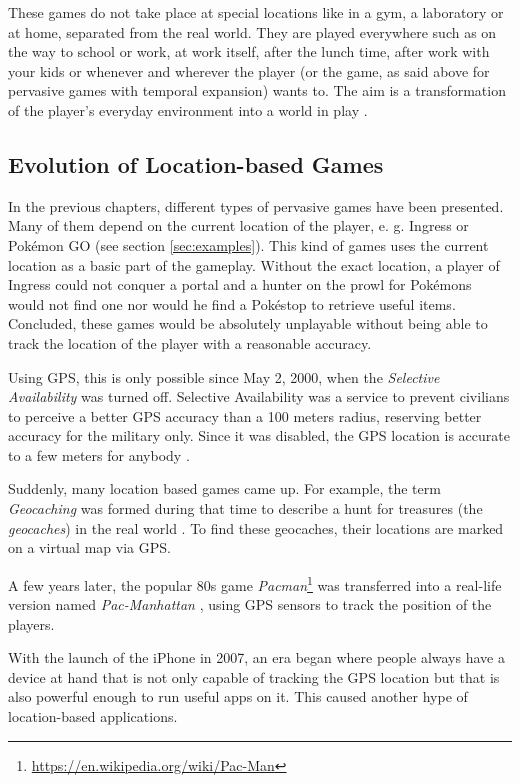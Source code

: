These games do not take place at special locations like in a gym, a laboratory or at home, separated from the real world. They are played everywhere such as on the way to school or work, at work itself, after the lunch time, after work with your kids or whenever and wherever the player (or the game, as said above for pervasive games with temporal expansion) wants to. The aim is a transformation of the player's everyday environment into a world in play \citep{nieuwdorp2009pervasive}.


\subsection{Evolution of Location-based Games}\label{sec:locationBasedGames}
In the previous chapters, different types of pervasive games have been presented. Many of them depend on the current location of the player, e. g. Ingress or Pok\'{e}mon GO (see section \ref{sec:examples}). This kind of games uses the current location as a basic part of the gameplay. Without the exact location, a player of Ingress could not conquer a portal and a hunter on the prowl for Pok\'{e}mons would not find one nor would he find a Pok\'{e}stop to retrieve useful items. Concluded, these games would be absolutely unplayable without being able to track the location of the player with a reasonable accuracy.

Using GPS, this is only possible since May 2, 2000, when the \emph{Selective Availability} was turned off. Selective Availability was a service to prevent civilians to perceive a better GPS accuracy than a 100 meters radius, reserving better accuracy for the military only. Since it was disabled, the GPS location is accurate to a few meters for anybody \citep{SelectiveAvailability}.

Suddenly, many location based games came up. For example, the term \emph{Geocaching} was formed during that time to describe a hunt for treasures (the \emph{geocaches}) in the real world \citep{Geocaching}. To find these geocaches, their locations are marked on a virtual map via GPS.

A few years later, the popular 80s game \emph{Pacman}\footnote{\url{https://en.wikipedia.org/wiki/Pac-Man}} was transferred into a real-life version named \emph{Pac-Manhattan} \citep{Pac-Manhattan}, using GPS sensors to track the position of the players.

With the launch of the iPhone in 2007, an era began where people always have a device at hand that is not only capable of tracking the GPS location but that is also powerful enough to run useful apps on it. This caused another hype of location-based applications.

